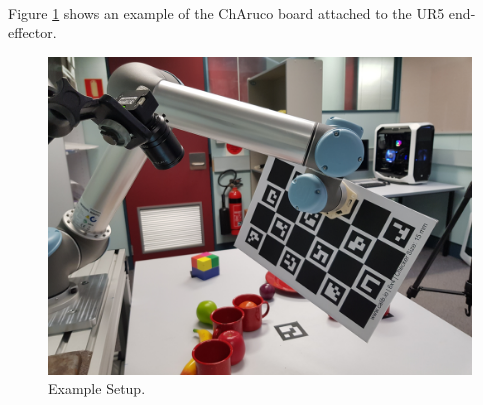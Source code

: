 \documentclass[10pt,a4paper]{article}
\begin{document}
\\
Figure \ref{fig:calib} shows an example of the ChAruco board attached to the UR5 end-effector.
\begin{figure}[H] \centering
	\includegraphics[width=1.0\textwidth]{exp}
	\caption{Example Setup.}
	\label{fig:calib}
\end{figure}
\end{document}
